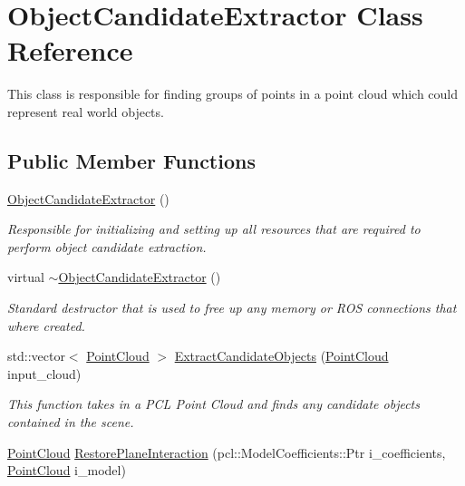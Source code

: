 \hypertarget{class_object_candidate_extractor}{\section{\-Object\-Candidate\-Extractor \-Class \-Reference}
\label{class_object_candidate_extractor}
}


\-This class is responsible for finding groups of points in a point cloud which could represent real world objects.  


\subsection*{\-Public \-Member \-Functions}
\begin{DoxyCompactItemize}
\item 
\hyperlink{class_object_candidate_extractor_a41916df0d27e926a337fff6e7e762010}{\-Object\-Candidate\-Extractor} ()
\begin{DoxyCompactList}\small\item\em \-Responsible for initializing and setting up all resources that are required to perform object candidate extraction. \end{DoxyCompactList}\item 
virtual \hyperlink{class_object_candidate_extractor_ad1aa824172a7d2e6002d5d7e3104d5d3}{$\sim$\-Object\-Candidate\-Extractor} ()
\begin{DoxyCompactList}\small\item\em \-Standard destructor that is used to free up any memory or \-R\-O\-S connections that where created. \end{DoxyCompactList}\item 
std\-::vector$<$ \hyperlink{_helper_functions_8h_abb956d1047f4dd2c956fe3cb0dd0004d}{\-Point\-Cloud} $>$ \hyperlink{class_object_candidate_extractor_a6a4adbcec19f94bc6073a4b2c2fa6f66}{\-Extract\-Candidate\-Objects} (\hyperlink{_helper_functions_8h_abb956d1047f4dd2c956fe3cb0dd0004d}{\-Point\-Cloud} input\-\_\-cloud)
\begin{DoxyCompactList}\small\item\em \-This function takes in a \-P\-C\-L \-Point \-Cloud and finds any candidate objects contained in the scene. \end{DoxyCompactList}\item 
\hyperlink{_helper_functions_8h_abb956d1047f4dd2c956fe3cb0dd0004d}{\-Point\-Cloud} \hyperlink{class_object_candidate_extractor_a6d54ffc5a2c1690b418107a31e34dfd2}{\-Restore\-Plane\-Interaction} (pcl\-::\-Model\-Coefficients\-::\-Ptr i\-\_\-coefficients, \hyperlink{_helper_functions_8h_abb956d1047f4dd2c956fe3cb0dd0004d}{\-Point\-Cloud} i\-\_\-model)

\end{DoxyCompactItemize}
